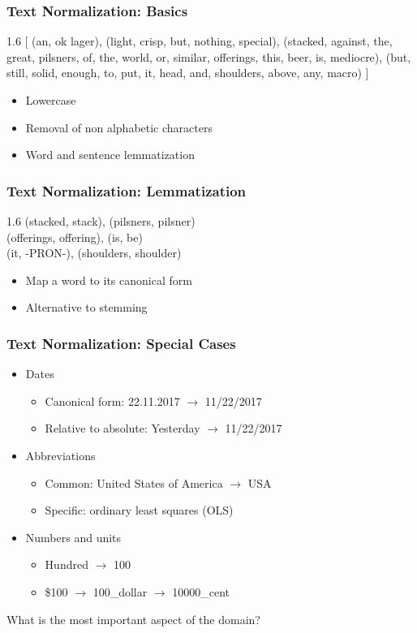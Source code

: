 \begin{frame}
    \frametitle{Text Normalization: Basics}
\begin{spacing}{1.6}
    [ (an, ok lager), (light, crisp, but, nothing, special), (stacked, against, the, great, pilsners, of, the, world, or, similar, offerings, this, beer, is, mediocre), (but, still, solid, enough, to, put, it, head, and, shoulders, above, any, macro) ]
\end{spacing}
\vspace{10pt}
\begin{itemize}
\item Lowercase
\item Removal of non alphabetic characters
\item Word and sentence lemmatization
\end{itemize}
\end{frame}

\begin{frame}
    \frametitle{Text Normalization: Lemmatization}
\begin{spacing}{1.6}
    (stacked, stack), (pilsners, pilsner) \\
    (offerings, offering), (is, be) \\
    (it, -PRON-), (shoulders, shoulder)
\end{spacing}
\vspace{10pt}
\begin{itemize}
\item Map a word to its canonical form
\item Alternative to stemming
\end{itemize}
\end{frame}

\begin{frame}
    \frametitle{Text Normalization: Special Cases}
\begin{itemize}
\item Dates
\begin{itemize}
\item Canonical form: 22.11.2017 $\rightarrow$ 11/22/2017
\item Relative to absolute: Yesterday $\rightarrow$ 11/22/2017
\end{itemize}
\item Abbreviations
\begin{itemize}
\item Common: United States of America $\rightarrow$ USA
\item Specific: ordinary least squares (OLS)
\end{itemize}
\item Numbers and units
\begin{itemize}
\item Hundred $\rightarrow$ 100
\item \$100 $\rightarrow$ 100\_dollar $\rightarrow$ 10000\_cent
\end{itemize}
\end{itemize}

\vspace{10pt}
What is the most important aspect of the domain?
\end{frame}

